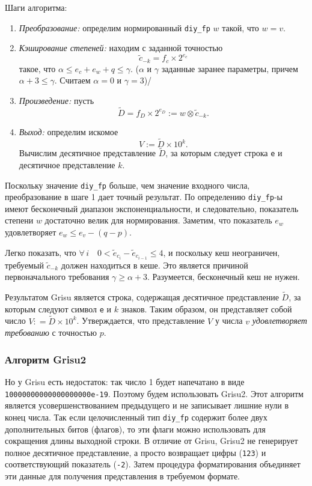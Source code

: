 \documentclass[specialist,subf,href,colorlinks=true,14pt
,times,mtpro,specialist
]{disser}
\begin{document}
Шаги алгоритма:
\begin{enumerate}
\item \textit{Преобразование:} определим нормированный \texttt{diy\_fp} $w$ такой, что $w = v$.
\item \textit{Кэширование степеней:} находим с заданной точностью $$\tilde{c}_{-k} = f_c \times 2^{e_c}$$ такое, что $\alpha \leqslant e_c + e_w + q \leqslant \gamma$. ($\alpha$ и $\gamma$ заданные заранее параметры, причем $\alpha + 3 \leqslant \gamma$. Считаем $\alpha=0$ и $\gamma=3$)/ 
\item \textit{Произведение:} пусть $$\tilde{D} = f_D \times 2^{e_D} := w \otimes \tilde{c}_{-k}.$$
\item \textit{Выход:} определим искомое $$V := \tilde{D} \times 10^k.$$ 
Вычислим десятичное представление $\tilde{D}$, за которым следует строка \texttt{e} и десятичное представление $k$.
\end{enumerate}
Поскольку значение \texttt{diy\_fp} больше, чем значение входного числа, преобразование в шаге 1 дает точный результат. 
По определению \texttt{diy\_fp}-ы имеют бесконечный диапазон экспоненциальности, и следовательно, показатель степени $w$ достаточно велик для нормирования. 
Заметим, что показатель $e_w$ удовлетворяет $e_w \leqslant e_v - (q - p)$. 
 
Легко показать, что $\forall \, i \quad 0 < \tilde{e}_{c_i} - \tilde{e}_{c_{i-1}} \leqslant 4$, и поскольку кеш неограничен, требуемый $\tilde{c}_{-k}$ должен находиться в кеше. 
Это является причиной первоначального требования $\gamma \geqslant \alpha + 3$.
Разумеется, бесконечный кеш не нужен. 

Результатом \textsf{Grisu} является строка, содержащая десятичное представление $\tilde{D}$, за которым следуют символ \texttt{e} и $k$ знаков. 
Таким образом, он представляет собой число $V: = \tilde{D} \times 10^k$. 
Утверждается, что представление $V$ у числа $v$ \textit{удовлетворяет требованию} с точностью $p$.

\subsubsection{Алгоритм \textsf{Grisu2}}
Но у \textsf{Grisu} есть недостаток: так число 1 будет напечатано в виде \\ \texttt{10000000000000000000e-19}.
Поэтому будем использовать \textsf{Grisu2}.
Этот алгоритм является усовершенствованием предыдущего и не записывает лишние нули в конец числа.
Так если целочисленный тип \texttt{diy\_fp} содержит более двух дополнительных битов (флагов), то эти флаги можно использовать для сокращения длины выходной строки.
В отличие от \textsf{Grisu}, \textsf{Grisu2} не генерирует полное десятичное представление, а просто возвращает цифры (\texttt{123}) и соответствующий показатель (\texttt{-2}). 
Затем процедура форматирования объединяет эти данные для получения представления в требуемом формате.
\end{document}
